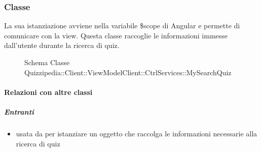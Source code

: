 \subsubsection{Classe }
La sua istanziazione avviene nella variabile \$scope di Angular e permette di comunicare con la view. Questa classe raccoglie le informazioni immesse dall'utente durante la ricerca di quiz.
\begin{figure}[H]
\centering
\noindent{}
\caption[Schema Classe MySearchQuiz]{Schema Classe Quizzipedia::Client::ViewModelClient::CtrlServices::MySearchQuiz}
\end{figure}
\paragraph{Relazioni con altre classi}
\subparagraph{Entranti}
\begin{itemize}
\item usata da  per istanziare un oggetto che raccolga le informazioni necessarie alla ricerca di quiz
\end{itemize}
